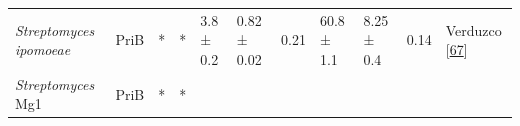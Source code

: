 \documentclass[12pt,twoside]{reedthesis}
\begin{document}
\begin{longtable}[]{@{}lllllllllll@{}}
  \begin{minipage}[t]{0.15\columnwidth}\raggedright\strut
  \emph{Streptomyces ipomoeae}\strut
  \end{minipage} & \begin{minipage}[t]{0.05\columnwidth}\raggedright\strut
  PriB\strut
  \end{minipage} & \begin{minipage}[t]{0.04\columnwidth}\raggedright\strut
  *\strut
  \end{minipage} & \begin{minipage}[t]{0.04\columnwidth}\raggedright\strut
  *\strut
  \end{minipage} & \begin{minipage}[t]{0.06\columnwidth}\raggedright\strut
  3.8 ± 0.2\strut
  \end{minipage} & \begin{minipage}[t]{0.06\columnwidth}\raggedright\strut
  0.82 ± 0.02\strut
  \end{minipage} & \begin{minipage}[t]{0.06\columnwidth}\raggedright\strut
  0.21\strut
  \end{minipage} & \begin{minipage}[t]{0.05\columnwidth}\raggedright\strut
  60.8 ± 1.1\strut
  \end{minipage} & \begin{minipage}[t]{0.05\columnwidth}\raggedright\strut
  8.25 ± 0.4\strut
  \end{minipage} & \begin{minipage}[t]{0.03\columnwidth}\raggedright\strut
  0.14\strut
  \end{minipage} & \begin{minipage}[t]{0.11\columnwidth}\raggedright\strut
  Verduzco
  {[}\protect\hyperlink{ref-verduzco-castro_co-occurrence_2016}{67}{]}\strut
  \end{minipage}\tabularnewline
  \begin{minipage}[t]{0.15\columnwidth}\raggedright\strut
  \emph{Streptomyces} Mg1\strut
  \end{minipage} & \begin{minipage}[t]{0.05\columnwidth}\raggedright\strut
  PriB\strut
  \end{minipage} & \begin{minipage}[t]{0.04\columnwidth}\raggedright\strut
  *\strut
  \end{minipage} & \begin{minipage}[t]{0.04\columnwidth}\raggedright\strut
  *\strut

\end{minipage}
\end{longtable}
\end{document}
